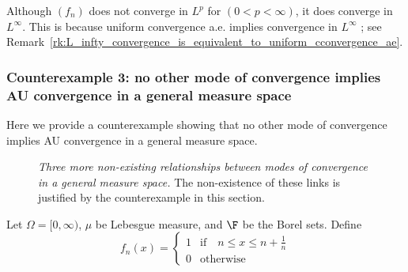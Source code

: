 \documentclass{article} %
\begin{document}
\begin{remark}{}
Although $(f_n)$ does not converge in $L^p$ for $(0<p<\infty)$, it does converge in $L^\infty$. This is because uniform convergence a.e. implies convergence in $L^\infty$ ; see Remark~\ref{rk:L_infty_convergence_is_equivalent_to_uniform_cconvergence_ae}.
\end{remark}

\subsubsection{Counterexample 3: no other mode of convergence implies AU convergence in a general measure space}


Here we provide a counterexample showing that no other mode of convergence implies AU convergence in a general measure space.


\begin{figure}[H]
\centering	
{}
\caption{ \textit{Three more non-existing relationships between modes of convergence in a general measure space.}  The non-existence of these links is justified by the counterexample in this section.}
\label{fig:non_existing_relationships_between_modes_of_convergence_in_a_general_measure_space_nothing_implies_AU}
\end{figure}

Let $\Omega=[0,\infty)$, $\mu$ be Lebesgue measure, and $\F$ be the Borel sets.  Define
\[f_n(x) =
\begin{cases}
1 & \text{if} \quad n \leq x \leq n+ \frac{1}{n} \\
0 & \text{otherwise}	
\end{cases}
 \]
 
\end{document}
